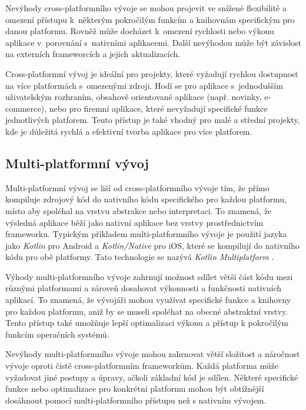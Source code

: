 Nevýhody cross-platformního vývoje se mohou projevit ve snížené flexibilitě a omezení přístupu k~některým pokročilým funkcím a knihovnám specifickým pro danou platformu. Rovněž může docházet k~omezení rychlosti nebo výkonu aplikace v~porovnání s~nativními aplikacemi. Další nevýhodou může být závislost na externích frameworcích a jejich aktualizacích.

Cross-platformní vývoj je ideální pro projekty, které vyžadují rychlou dostupnost na více platformách s~omezenými zdroji. Hodí se pro aplikace s~jednodušším uživatelským rozhraním, obsahově orientované aplikace (např. novinky, e-commerce), nebo pro firemní aplikace, které nevyžadují specifické funkce jednotlivých platforem. Tento přístup je také vhodný pro malé a střední projekty, kde je důležitá rychlá a efektivní tvorba aplikace pro více platforem.

\subsection{Multi-platformní vývoj}

Multi-platformní vývoj se liší od cross-platformního vývoje tím, že přímo kompiluje zdrojový kód do nativního kódu specifického pro každou platformu, místo aby spoléhal na vrstvu abstrakce nebo interpretaci. To znamená, že výsledná aplikace běží jako nativní aplikace bez vrstvy prostřednictvím frameworku. Typickým příkladem multi-platformního vývoje je použití jazyka jako \emph{Kotlin} pro Android a \emph{Kotlin/Native} pro iOS, které se kompilují do nativního kódu pro obě platformy. Tato technologie se nazývá \emph{Kotlin Multiplatform} \cite{kotlin-multiplatform}.

Výhody multi-platformního vývoje zahrnují možnost sdílet větší část kódu mezi různými platformami a zároveň dosahovat výkonnosti a funkčnosti nativních aplikací. To znamená, že vývojáři mohou využívat specifické funkce a knihovny pro každou platformu, aniž by se museli spoléhat na obecné abstraktní vrstvy. Tento přístup také umožňuje lepší optimalizaci výkonu a přístup k pokročilým funkcím operačních systémů.

Nevýhody multi-platformního vývoje mohou zahrnovat větší složitost a náročnost vývoje oproti čistě cross-platformním frameworkům. Každá platforma může vyžadovat jiné postupy a úpravy, ačkoli základní kód je sdílen. Některé specifické funkce nebo optimalizace pro konkrétní platformu mohou být obtížnější dosáhnout pomocí multi-platformního přístupu než s nativním vývojem.


